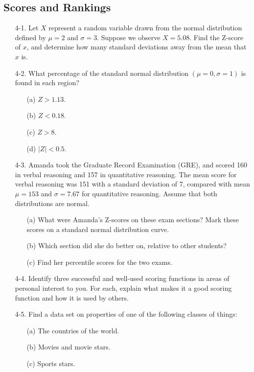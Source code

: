 \documentclass[10pt]{article}
\begin{document}
\subsection*{Scores and Rankings}
\begin{enumerate}
    \item [4-1.] Let $X$ represent a random variable drawn from the normal distribution defined by $\mu=2$ and $\sigma=3$. Suppose we observe $X=5.08$. Find the Z-score of $x$, and determine how many standard deviations away from the mean that $x$ is.
    \item [4-2.] What percentage of the standard normal distribution $(\mu=0, \sigma=1)$ is found in each region?
    \begin{itemize}
        \item [(a)] $Z>1.13$.
        \item [(b)] $Z<0.18$.
        \item [(c)] $Z>8$.
        \item [(d)] $|Z|<0.5$.
    \end{itemize}
    \item [4-3.] Amanda took the Graduate Record Examination (GRE), and scored 160 in verbal reasoning and 157 in quantitative reasoning. The mean score for verbal reasoning was 151 with a standard deviation of 7, compared with mean $\mu=153$ and $\sigma=7.67$ for quantitative reasoning. Assume that both distributions are normal.
    \begin{itemize}
        \item [(a)] What were Amanda's Z-scores on these exam sections? Mark these scores on a standard normal distribution curve.
        \item [(b)] Which section did she do better on, relative to other students?
        \item [(c)] Find her percentile scores for the two exams.
    \end{itemize}
    \item [4-4.] Identify three successful and well-used scoring functions in areas of personal interest to you. For each, explain what makes it a good scoring function and how it is used by others.
    \item [4-5.] Find a data set on properties of one of the following classes of things:
    \begin{itemize}
        \item [(a)] The countries of the world.
        \item [(b)] Movies and movie stars.
        \item [(c)] Sports stars.

\end{itemize}
\end{enumerate}
\end{document}
